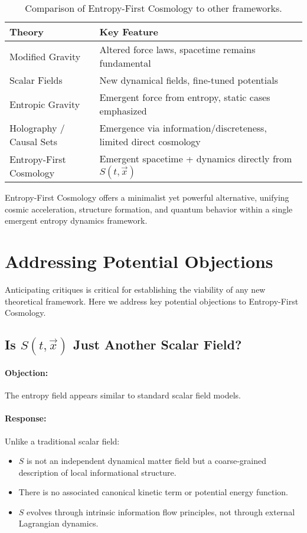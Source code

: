 \documentclass{article}
\begin{document}
\begin{table}[h]
\centering
\begin{tabular}{|l|l|}
\hline
Theory & Key Feature \\
\hline
Modified Gravity & Altered force laws, spacetime remains fundamental \\
Scalar Fields & New dynamical fields, fine-tuned potentials \\
Entropic Gravity & Emergent force from entropy, static cases emphasized \\
Holography / Causal Sets & Emergence via information/discreteness, limited direct cosmology \\
Entropy-First Cosmology & Emergent spacetime + dynamics directly from $S(t, \vec{x})$ \\
\hline
\end{tabular}
\caption{Comparison of Entropy-First Cosmology to other frameworks.}
\end{table}

Entropy-First Cosmology offers a minimalist yet powerful alternative, unifying cosmic acceleration, structure formation, and quantum behavior within a single emergent entropy dynamics framework.

\section{Addressing Potential Objections}

Anticipating critiques is critical for establishing the viability of any new theoretical framework.
Here we address key potential objections to Entropy-First Cosmology.

\subsection{Is $S(t, \vec{x})$ Just Another Scalar Field?}

\paragraph{Objection:}  
The entropy field appears similar to standard scalar field models.

\paragraph{Response:}
Unlike a traditional scalar field:
\begin{itemize}
    \item $S$ is not an independent dynamical matter field but a coarse-grained description of local informational structure.
    \item There is no associated canonical kinetic term or potential energy function.
    \item $S$ evolves through intrinsic information flow principles, not through external Lagrangian dynamics.
\end{itemize}
\end{document}
